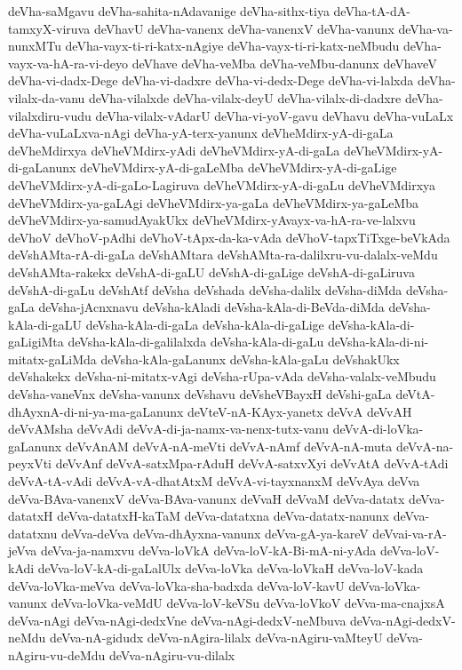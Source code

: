 {deVha-saMgavu
deVha-sahita-nAdavanige
deVha-sithx-tiya
deVha-tA-dA-tamxyX-viruva
deVhavU
deVha-vanenx
deVha-vanenxV
deVha-vanunx
deVha-va-nunxMTu
deVha-vayx-ti-ri-katx-nAgiye
deVha-vayx-ti-ri-katx-neMbudu
deVha-vayx-va-hA-ra-vi-deyo
deVhave
deVha-veMba
deVha-veMbu-danunx
deVhaveV
deVha-vi-dadx-Dege
deVha-vi-dadxre
deVha-vi-dedx-Dege
deVha-vi-lalxda
deVha-vilalx-da-vanu
deVha-vilalxde
deVha-vilalx-deyU
deVha-vilalx-di-dadxre
deVha-vilalxdiru-vudu
deVha-vilalx-vAdarU
deVha-vi-yoV-gavu
deVhavu
deVha-vuLaLx
deVha-vuLaLxva-nAgi
deVha-yA-terx-yanunx
deVheMdirx-yA-di-gaLa
deVheMdirxya
deVheVMdirx-yAdi
deVheVMdirx-yA-di-gaLa
deVheVMdirx-yA-di-gaLanunx
deVheVMdirx-yA-di-gaLeMba
deVheVMdirx-yA-di-gaLige
deVheVMdirx-yA-di-gaLo-Lagiruva
deVheVMdirx-yA-di-gaLu
deVheVMdirxya
deVheVMdirx-ya-gaLAgi
deVheVMdirx-ya-gaLa
deVheVMdirx-ya-gaLeMba
deVheVMdirx-ya-samudAyakUkx
deVheVMdirx-yAvayx-va-hA-ra-ve-lalxvu
deVhoV
deVhoV-pAdhi
deVhoV-tApx-da-ka-vAda
deVhoV-tapxTiTxge-beVkAda
deVshAMta-rA-di-gaLa
deVshAMtara
deVshAMta-ra-dalilxru-vu-dalalx-veMdu
deVshAMta-rakekx
deVshA-di-gaLU
deVshA-di-gaLige
deVshA-di-gaLiruva
deVshA-di-gaLu
deVshAtf
deVsha
deVshada
deVsha-dalilx
deVsha-diMda
deVsha-gaLa
deVsha-jAcnxnavu
deVsha-kAladi
deVsha-kAla-di-BeVda-diMda
deVsha-kAla-di-gaLU
deVsha-kAla-di-gaLa
deVsha-kAla-di-gaLige
deVsha-kAla-di-gaLigiMta
deVsha-kAla-di-galilalxda
deVsha-kAla-di-gaLu
deVsha-kAla-di-ni-mitatx-gaLiMda
deVsha-kAla-gaLanunx
deVsha-kAla-gaLu
deVshakUkx
deVshakekx
deVsha-ni-mitatx-vAgi
deVsha-rUpa-vAda
deVsha-valalx-veMbudu
deVsha-vaneVnx
deVsha-vanunx
deVshavu
deVsheVBayxH
deVshi-gaLa
deVtA-dhAyxnA-di-ni-ya-ma-gaLanunx
deVteV-nA-KAyx-yanetx
deVvA
deVvAH
deVvAMsha
deVvAdi
deVvA-di-ja-namx-va-nenx-tutx-vanu
deVvA-di-loVka-gaLanunx
deVvAnAM
deVvA-nA-meVti
deVvA-nAmf
deVvA-nA-muta
deVvA-na-peyxVti
deVvAnf
deVvA-satxMpa-rAduH
deVvA-satxvXyi
deVvAtA
deVvA-tAdi
deVvA-tA-vAdi
deVvA-vA-dhatAtxM
deVvA-vi-tayxnanxM
deVvAya
deVva
deVva-BAva-vanenxV
deVva-BAva-vanunx
deVvaH
deVvaM
deVva-datatx
deVva-datatxH
deVva-datatxH-kaTaM
deVva-datatxna
deVva-datatx-nanunx
deVva-datatxnu
deVva-deVva
deVva-dhAyxna-vanunx
deVva-gA-ya-kareV
deVvai-va-rA-jeVva
deVva-ja-namxvu
deVva-loVkA
deVva-loV-kA-Bi-mA-ni-yAda
deVva-loV-kAdi
deVva-loV-kA-di-gaLalUlx
deVva-loVka
deVva-loVkaH
deVva-loV-kada
deVva-loVka-meVva
deVva-loVka-sha-badxda
deVva-loV-kavU
deVva-loVka-vanunx
deVva-loVka-veMdU
deVva-loV-keVSu
deVva-loVkoV
deVva-ma-cnajxsA
deVva-nAgi
deVva-nAgi-dedxVne
deVva-nAgi-dedxV-neMbuva
deVva-nAgi-dedxV-neMdu
deVva-nA-gidudx
deVva-nAgira-lilalx
deVva-nAgiru-vaMteyU
deVva-nAgiru-vu-deMdu
deVva-nAgiru-vu-dilalx
}

